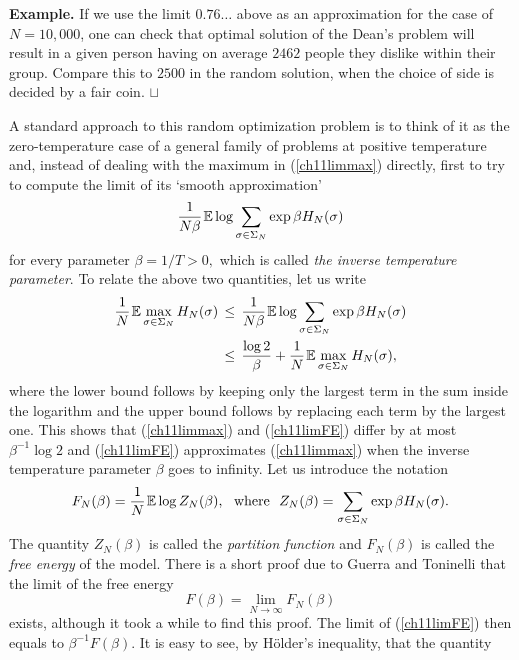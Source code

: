 \documentclass[12pt]{article}
\newcommand{\smsp}{\hspace{0.3mm}}
\newcommand{\e}{\mathbb{E}}
\newcommand\qed{\hfill\hbox{\rlap{$\sqcap$}$\sqcup$}}
\theoremstyle{nonumberplain}
\begin{document}
\medskip
\noindent
\textbf{Example.} If we use the limit $0.76\ldots$ above as an approximation for the case of $N=10,000$, one can check that optimal solution of the Dean's problem will result in a given person having on average $2462$ people they dislike within their group. Compare this to $2500$ in the random solution, when the choice of side is decided by a fair coin. \qed

\medskip
\noindent
A standard approach to this random optimization problem is to think of it as the zero-temperature case of a general family of problems at positive temperature and, instead of dealing with the maximum in (\ref{ch11limmax}) directly, first to try to compute the limit of its `smooth approximation'
\begin{equation}
\frac{1}{N\beta}\smsp \e \log \sum_{\sigma\in\Sigma_N} \exp \beta H_N(\sigma)
\label{ch11limFE}
\end{equation}
for every parameter $\beta=1/T>0,$ which is called \emph{the inverse temperature parameter}. To relate the above two quantities, let us write
\begin{align}
\frac{1}{N}\smsp \e \max_{\sigma\in\Sigma_N} H_N(\sigma)
& \,\leq\,
\frac{1}{N\beta}\smsp \e \log \sum_{\sigma\in\Sigma_N} \exp \beta H_N(\sigma)
\nonumber
\\
& \,\leq\,
\frac{\log 2}{\beta}
+\frac{1}{N}\smsp \e \max_{\sigma\in\Sigma_N} H_N(\sigma),
\label{ch11compare}
\end{align}
where the lower bound follows by keeping only the largest term in the sum inside the logarithm and the upper bound follows by replacing each term by the largest one. This shows that (\ref{ch11limmax}) and (\ref{ch11limFE}) differ by at most $\beta^{-1}\log 2$ and (\ref{ch11limFE}) approximates (\ref{ch11limmax}) when the inverse temperature parameter $\beta$ goes to infinity. Let us introduce the notation
\begin{equation}
F_N(\beta) = \frac{1}{N}\smsp \e \log Z_N(\beta),
\,\,\mbox{ where }\,\,
Z_N(\beta) = \sum_{\sigma\in\Sigma_N} \exp \beta H_N(\sigma).
\label{ch11FE}
\end{equation}
The quantity $Z_N(\beta)$ is called the \emph{partition function} and $F_N(\beta)$ is called the \emph{free energy} of the model. There is a short proof due to Guerra and Toninelli \cite{GuerraToninelli} that the limit of the free energy
$$
F(\beta) = \lim_{N\to\infty} F_N(\beta)
$$ 
exists, although it took a while to find this proof. The limit of (\ref{ch11limFE}) then equals to $\beta^{-1}F(\beta)$. It is easy to see, by H\"older's inequality, that the quantity
\end{document}
